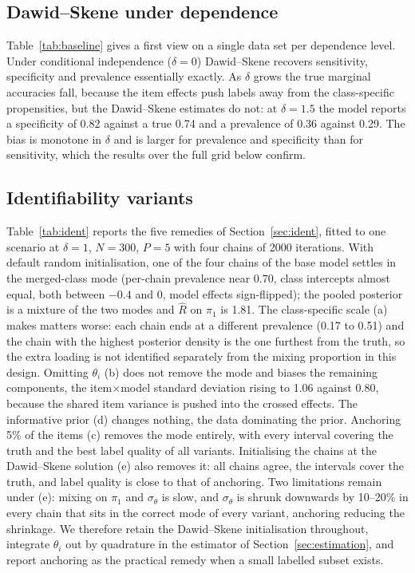 \subsection{Dawid--Skene under dependence}\label{sec:sim_ds}

Table~\ref{tab:baseline} gives a first view on a single data set per dependence level.
Under conditional independence ($\delta = 0$) Dawid--Skene recovers sensitivity,
specificity and prevalence essentially exactly. As $\delta$ grows the true marginal
accuracies fall, because the item effects push labels away from the class-specific
propensities, but the Dawid--Skene estimates do not: at $\delta = 1.5$ the model reports a
specificity of 0.82 against a true 0.74 and a prevalence of 0.36 against 0.29. The bias is
monotone in $\delta$ and is larger for prevalence and specificity than for sensitivity,
which the results over the full grid below confirm.


\subsection{Identifiability variants}\label{sec:sim_ident}

Table~\ref{tab:ident} reports the five remedies of Section~\ref{sec:ident}, fitted to
one scenario at $\delta = 1$, $N = 300$, $P = 5$ with four chains of 2000 iterations. With
default random initialisation, one of the four chains of the base model settles in the
merged-class mode (per-chain prevalence near 0.70, class intercepts almost equal, both
between $-0.4$ and 0, model effects sign-flipped); the pooled posterior is a mixture of the two modes and
$\widehat{R}$ on $\pi_1$ is 1.81. The class-specific scale (a) makes matters worse: each
chain ends at a different prevalence (0.17 to 0.51) and the chain with the highest
posterior density is the one furthest from the truth, so the extra loading is not
identified separately from the mixing proportion in this design. Omitting $\theta_i$ (b)
does not remove the mode and biases the remaining components, the item$\times$model
standard deviation rising to 1.06 against 0.80, because the shared item variance is pushed
into the crossed effects. The informative prior (d) changes nothing, the data dominating
the prior. Anchoring 5\% of the items (c) removes the mode entirely, with every interval
covering the truth and the best label quality of all variants. Initialising the chains at
the Dawid--Skene solution (e) also removes it: all chains agree, the intervals cover the
truth, and label quality is close to that of anchoring. Two limitations remain under (e):
mixing on $\pi_1$ and $\sigma_\theta$ is slow, and $\sigma_\theta$ is shrunk downwards by
10--20\% in every chain that sits in the correct mode of every variant, anchoring
reducing the shrinkage. We therefore retain the Dawid--Skene initialisation throughout, integrate $\theta_i$ out by quadrature in the estimator of Section~\ref{sec:estimation}, and report anchoring as the practical remedy when a small labelled subset exists.


